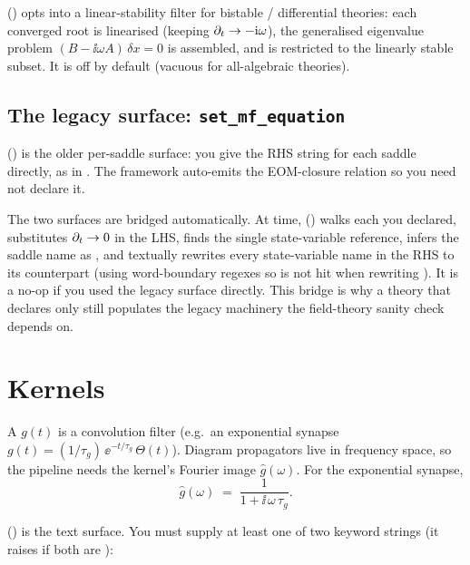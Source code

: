  () opts into a
linear-stability filter for bistable / differential theories: each converged root
is linearised (keeping $\partial_t\to -\mathrm{i}\omega$), the generalised eigenvalue problem
$(B - \ii\omega A)\,\delta x = 0$ is assembled, and  is
restricted to the linearly stable subset. It is off by default (vacuous for
all-algebraic theories).

\subsection{The legacy surface: \texttt{set\_mf\_equation}}

 ()
is the older per-saddle surface: you give the RHS string for each saddle directly,
as in . The framework
auto-emits the EOM-closure relation  so you need not
declare it.

The two surfaces are bridged automatically. At  time,
 ()
walks each  you declared, substitutes $\partial_t\to 0$ in the LHS,
finds the single state-variable reference, infers the saddle name as
, and textually rewrites every state-variable name in the RHS to
its  counterpart (using word-boundary regexes so  is not hit
when rewriting ). It is a no-op if you used the legacy surface directly.
This bridge is why a theory that declares only  still
populates the legacy machinery the field-theory sanity check depends on.

\section{Kernels}

A  $g(t)$ is a convolution filter (e.g.\ an exponential synapse
$g(t) = (1/\tau_g)\,\ee^{-t/\tau_g}\,\Theta(t)$). Diagram propagators live in
frequency space, so the pipeline needs the kernel's Fourier image
$\hat g(\omega)$. For the exponential synapse,
\[
  \hat g(\omega) \;=\; \frac{1}{1 + \ii\,\omega\,\tau_g}.
\]

 () is the text surface. You must
supply at least one of two keyword strings (it raises if both are ):

